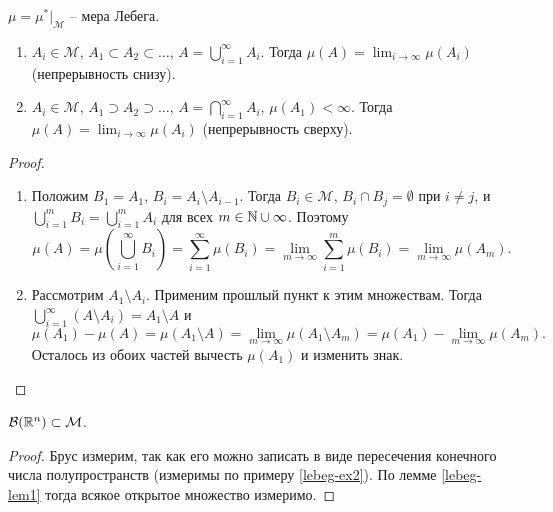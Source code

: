 \begin{definition}
    $\mu = \mu^{*}\lvert_{\mathcal{M}}$ -- мера Лебега.
\end{definition}

\begin{theorem}
    \begin{enumerate}
        \item $A_{i} \in \mathcal{M}$, $A_{1} \subset A_{2} \subset \ldots$, $A = \bigcup_{i = 1}^{\infty} A_{i}$. Тогда $\mu(A) = \lim_{i \to \infty}\mu(A_{i})$ (непрерывность снизу).
        \item $A_{i} \in \mathcal{M}$, $A_{1} \supset A_{2} \supset \ldots$, $A = \bigcap_{i = 1}^{\infty}A_{i}$, $\mu(A_{1}) < \infty$. Тогда $\mu(A) = \lim_{i \to \infty}\mu(A_{i})$ (непрерывность сверху).
    \end{enumerate}
\end{theorem}

\begin{proof}
    \begin{enumerate}
        \item Положим $B_{1} = A_{1}$, $B_{i} = A_{i} \setminus A_{i - 1}$. Тогда $B_{i} \in \mathcal{M}$, $B_{i} \cap B_{j} = \emptyset$ при $i \neq j$, и $\bigcup_{i = 1}^{m}B_{i} = \bigcup_{i = 1}^{m}A_{i}$ для всех $m \in \mathbb{N} \cup \infty$. Поэтому
        \[\mu(A) = \mu\left(\bigcup_{i = 1}^{\infty}B_{i}\right) = \sum_{i = 1}^{\infty}\mu(B_{i}) = \lim_{m \to \infty}\sum_{i = 1}^{m} \mu(B_{i}) = \lim_{m \to \infty}\mu(A_{m}).\]
        \item Рассмотрим $A_{1} \setminus A_{i}$. Применим прошлый пункт к этим множествам. Тогда $\bigcup_{i = 1}^{\infty}(A \setminus A_{i}) = A_{1} \setminus A$ и 
        \[\mu(A_{1}) - \mu(A) = \mu(A_{1} \setminus A) = \lim_{m \to \infty}\mu(A_{1} \setminus A_{m}) = \mu(A_{1}) - \lim_{m \to \infty}\mu(A_{m}).\]
        Осталось из обоих частей вычесть $\mu(A_{1})$ и изменить знак.
    \end{enumerate}
\end{proof}

\begin{lemma}
    $\mathcal{B}(\mathbb{R}^{n}) \subset \mathcal{M}$.
\end{lemma}

\begin{proof}
    Брус измерим, так как его можно записать в виде пересечения конечного числа полупространств (измеримы по примеру \ref{lebeg-ex2}). По лемме \ref{lebeg-lem1} тогда всякое открытое множество измеримо.
\end{proof}

